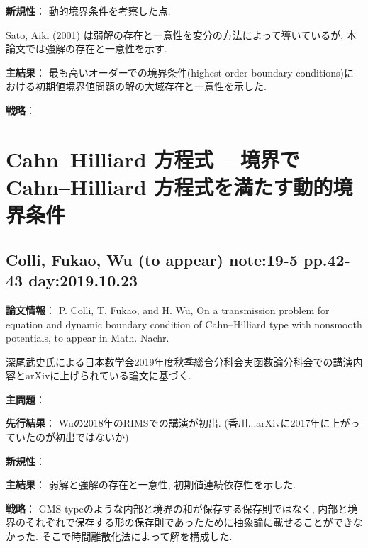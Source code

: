 \documentclass[a4paper]{jsarticle}
\begin{document}
{\bf 新規性}：
動的境界条件を考察した点.

Sato, Aiki (2001) \cite{SatoAiki2001} は弱解の存在と一意性を変分の方法によって導いているが, 本論文では強解の存在と一意性を示す.

{\bf 主結果}：
最も高いオーダーでの境界条件(highest-order boundary conditions)における初期値境界値問題の解の大域存在と一意性を示した.

{\bf 戦略}：



\newpage

\section{Cahn--Hilliard 方程式 -- 境界で Cahn--Hilliard 方程式を満たす動的境界条件}

\subsection{Colli, Fukao, Wu (to appear) \cite{ColliFukaoWu2020} note:19-5 pp.42-43 day:2019.10.23}
{\bf 論文情報}：
P. Colli, T. Fukao, and H. Wu, On a transmission problem for equation and dynamic boundary condition of Cahn–Hilliard type with nonsmooth potentials, to appear in Math. Nachr.

深尾武史氏による日本数学会2019年度秋季総合分科会実函数論分科会での講演内容とarXivに上げられている論文に基づく.

{\bf 主問題}：

{\bf 先行結果}：
Wuの2018年のRIMSでの講演が初出.
(香川...arXivに2017年に上がっていたのが初出ではないか)

{\bf 新規性}：

{\bf 主結果}：
弱解と強解の存在と一意性, 初期値連続依存性を示した.

{\bf 戦略}：
GMS typeのような内部と境界の和が保存する保存則ではなく, 内部と境界のそれぞれで保存する形の保存則であったために抽象論に載せることができなかった.
そこで時間離散化法によって解を構成した.



\newpage
\end{document}
